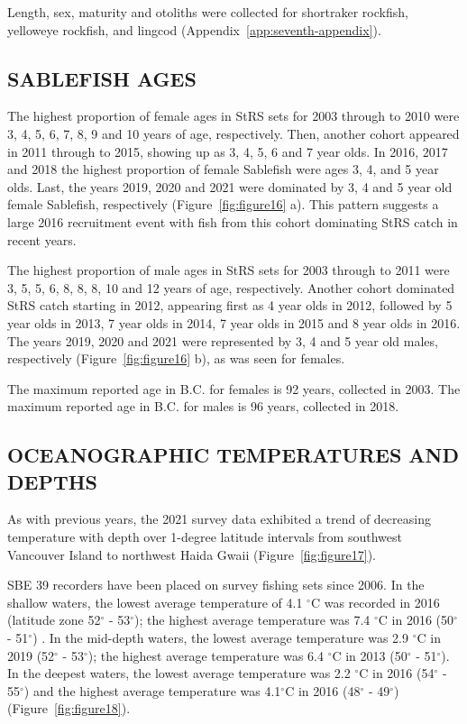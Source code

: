 \documentclass[12pt]{article}\usepackage[]{graphicx}\usepackage[]{color}
\begin{document}
Length, sex, maturity and otoliths were collected for shortraker rockfish, yelloweye rockfish, and lingcod (Appendix~\ref{app:seventh-appendix}).

\hypertarget{sablefish-ages}{%
\subsection{SABLEFISH AGES}\label{sablefish-ages}}

The highest proportion of female ages in StRS sets for 2003 through to 2010 were 3, 4, 5, 6, 7, 8, 9 and 10 years of age, respectively. Then, another cohort appeared in 2011 through to 2015, showing up as 3, 4, 5, 6 and 7 year olds. In 2016, 2017 and 2018 the highest proportion of female Sablefish were ages 3, 4, and 5 year olds. Last, the years 2019, 2020 and 2021 were dominated by 3, 4 and 5 year old female Sablefish, respectively (Figure~\ref{fig:figure16} a). This pattern suggests a large 2016 recruitment event with fish from this cohort dominating StRS catch in recent years.

The highest proportion of male ages in StRS sets for 2003 through to 2011 were 3, 5, 5, 6, 8, 8, 8, 10 and 12 years of age, respectively. Another cohort dominated StRS catch starting in 2012, appearing first as 4 year olds in 2012, followed by 5 year olds in 2013, 7 year olds in 2014, 7 year olds in 2015 and 8 year olds in 2016. The years 2019, 2020 and 2021 were represented by 3, 4 and 5 year old males, respectively (Figure~\ref{fig:figure16} b), as was seen for females.

The maximum reported age in B.C. for females is 92 years, collected in 2003. The maximum reported age in B.C. for males is 96 years, collected in 2018.

\hypertarget{oceanographic-temperatures-and-depths}{%
\subsection{OCEANOGRAPHIC TEMPERATURES AND DEPTHS}\label{oceanographic-temperatures-and-depths}}

As with previous years, the 2021 survey data exhibited a trend of decreasing temperature with depth over 1-degree latitude intervals from southwest Vancouver Island to northwest Haida Gwaii (Figure~\ref{fig:figure17}).

SBE 39 recorders have been placed on survey fishing sets since 2006. In the shallow waters, the lowest average temperature of 4.1 \(^\circ\)C was recorded in 2016 (latitude zone 52\(^\circ\) - 53\(^\circ\)); the highest average temperature was 7.4 \(^\circ\)C in 2016 (50\(^\circ\) - 51\(^\circ\)) . In the mid-depth waters, the lowest average temperature was 2.9 \(^\circ\)C in 2019 (52\(^\circ\) - 53\(^\circ\)); the highest average temperature was 6.4 \(^\circ\)C in 2013 (50\(^\circ\) - 51\(^\circ\)). In the deepest waters, the lowest average temperature was 2.2 \(^\circ\)C in 2016 (54\(^\circ\) - 55\(^\circ\)) and the highest average temperature was 4.1\(^\circ\)C in 2016 (48\(^\circ\) - 49\(^\circ\)) (Figure~\ref{fig:figure18}).
\end{document}
